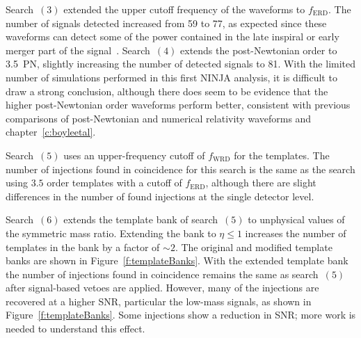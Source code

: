 Search~$(3)$ extended the upper cutoff frequency of the waveforms to
$f_\mathrm{ERD}$. The number of signals detected increased from 59 to
77, as expected since these waveforms can detect some of the power
contained in the late inspiral or early merger part of the
signal~\cite{Pan:2007nw,Boyle:2009dg}. Search~$(4)$ extends the
post-Newtonian order to 3.5~PN, slightly increasing the number of
detected signals to 81.  With the limited number of simulations
performed in this first NINJA analysis, it is difficult to draw a
strong conclusion, although there does seem to be evidence that the
higher post-Newtonian order waveforms perform better, consistent with
previous comparisons of post-Newtonian and numerical relativity
waveforms
\cite{Pan:2007nw,Baker:2006ha,Hannam:2007ik,Boyle:2008ge,Boyle:2009dg}
and chapter~\ref{c:boyleetal}.

Search~$(5)$ uses an upper-frequency cutoff of $f_\mathrm{WRD}$ for
the templates. The number of injections found in coincidence for this
search is the same as the search using $3.5$ order templates with a
cutoff of $f_\mathrm{ERD}$, although there are slight differences in
the number of found injections at the single detector level.

Search~$(6)$ extends the template bank of search~$(5)$ to unphysical
values of the symmetric mass ratio. Extending the bank to $\eta\le 1$
increases the number of templates in the bank by a factor of $\sim 2$.
The original and modified template banks are shown in
Figure~\ref{f:templateBanks}. With the extended template bank the
number of injections found in coincidence remains the same as
search~$(5)$ after signal-based vetoes are applied.  However, many of
the injections are recovered at a higher SNR, particular the low-mass
signals, as shown in Figure~\ref{f:templateBanks}.  Some injections
show a reduction in SNR; more work is needed to understand this
effect.


